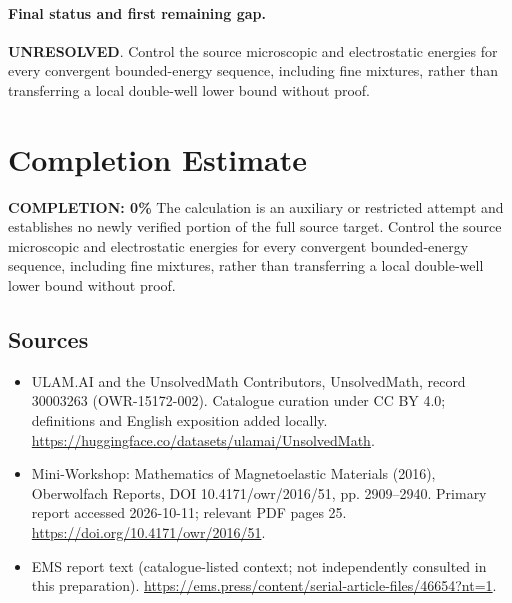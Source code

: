 \documentclass[11pt]{article}
\begin{document}
\paragraph{Final status and first remaining gap.}
\textbf{UNRESOLVED}. Control the source microscopic and electrostatic energies for every convergent bounded-energy sequence, including fine mixtures, rather than transferring a local double-well lower bound without proof.

\section{Completion Estimate}
\noindent\textbf{COMPLETION: 0\%}
The calculation is an auxiliary or restricted attempt and establishes no newly verified portion of the full source target. Control the source microscopic and electrostatic energies for every convergent bounded-energy sequence, including fine mixtures, rather than transferring a local double-well lower bound without proof.

\subsection{Sources}
\begin{itemize}
\item[\hypertarget{source:30003263:1}{S1}] ULAM.AI and the UnsolvedMath Contributors, UnsolvedMath, record 30003263 (OWR-15172-002). Catalogue curation under CC BY 4.0; definitions and English exposition added locally.
\url{https://huggingface.co/datasets/ulamai/UnsolvedMath}.
\item[\hypertarget{source:30003263:2}{S2}] Mini-Workshop: Mathematics of Magnetoelastic Materials (2016), Oberwolfach Reports, DOI 10.4171/owr/2016/51, pp. 2909--2940. Primary report accessed 2026-10-11; relevant PDF pages 25.
\url{https://doi.org/10.4171/owr/2016/51}.
\item[\hypertarget{source:30003263:3}{S3}] EMS report text (catalogue-listed context; not independently consulted in this preparation).
\url{https://ems.press/content/serial-article-files/46654?nt=1}.
\end{itemize}
\label{end:30003263}
\end{document}
